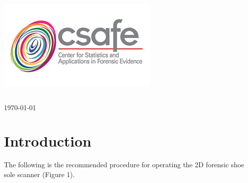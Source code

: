 \begin{titlepage}
\includegraphics[scale=.5]{Logo}\\[1cm]

\begin{center}
\begin{tabular}{ c   |   c } 
 
\end{tabular}
\end{center}

{\large \today}\\[2cm] %


 

\vfill %

\end{titlepage}




\section{Introduction}

The following is the recommended procedure for operating the 2D forensic shoe sole scanner (Figure 1). 


